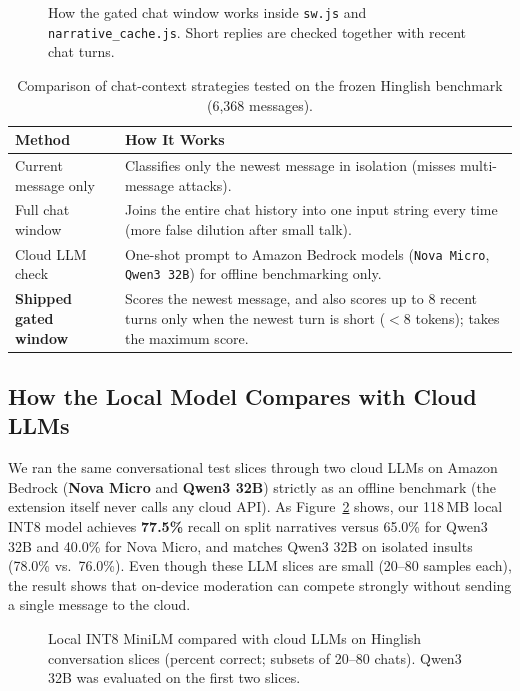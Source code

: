 \documentclass[11pt,a4paper]{article}
\begin{document}
\begin{figure}[H]
  \centering
  \resizebox{0.88\textwidth}{!}{}
  \caption{How the gated chat window works inside \texttt{sw.js} and \texttt{narrative\_cache.js}. Short replies are checked together with recent chat turns.}
  \label{fig:gate}
\end{figure}

\begin{table}[H]
\centering
\caption{Comparison of chat-context strategies tested on the frozen Hinglish benchmark (6{,}368 messages).}
\label{tab:evaluation_protocols}
\small
\begin{tabularx}{\textwidth}{l X}
\toprule
\textbf{Method} & \textbf{How It Works} \\
\midrule
Current message only & Classifies only the newest message in isolation (misses multi-message attacks). \\
Full chat window & Joins the entire chat history into one input string every time (more false dilution after small talk). \\
Cloud LLM check & One-shot prompt to Amazon Bedrock models (\texttt{Nova Micro}, \texttt{Qwen3 32B}) for offline benchmarking only. \\
\textbf{Shipped gated window} & Scores the newest message, and also scores up to 8 recent turns only when the newest turn is short ($<8$ tokens); takes the maximum score. \\
\bottomrule
\end{tabularx}
\end{table}

\subsection{How the Local Model Compares with Cloud LLMs}
We ran the same conversational test slices through two cloud LLMs on Amazon Bedrock (\textbf{Nova Micro} and \textbf{Qwen3 32B}) strictly as an offline benchmark (the extension itself never calls any cloud API). As Figure~\ref{fig:bedrock} shows, our 118\,MB local INT8 model achieves \textbf{77.5\%} recall on split narratives versus 65.0\% for Qwen3 32B and 40.0\% for Nova Micro, and matches Qwen3 32B on isolated insults (78.0\% vs.\ 76.0\%). Even though these LLM slices are small (20--80 samples each), the result shows that on-device moderation can compete strongly without sending a single message to the cloud.

\begin{figure}[H]
  \centering
  \resizebox{0.78\textwidth}{!}{}
  \caption{Local INT8 MiniLM compared with cloud LLMs on Hinglish conversation slices (percent correct; subsets of 20--80 chats). Qwen3 32B was evaluated on the first two slices.}
  \label{fig:bedrock}
\end{figure}
\end{document}
